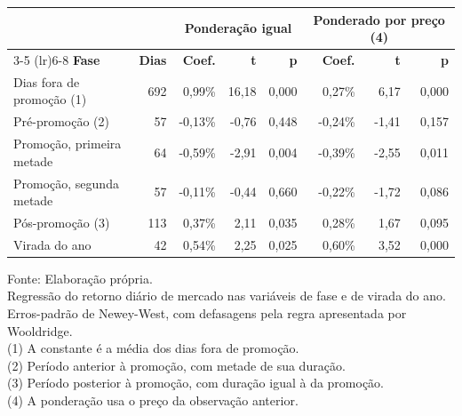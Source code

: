 \begingroup
\setlength{}
\setlength{}
\fontsize{11.0pt}{13.2pt}\selectfont

\setlength{\LTpost}{0mm}
\begin{longtable}{@{\extracolsep{\fill}}lrrrrrrr}

\toprule
 &  & \multicolumn{3}{c}{\textbf{Ponderação igual}} & \multicolumn{3}{c}{\textbf{Ponderado por preço} (4)} \\ 
\cmidrule(lr){3-5} \cmidrule(lr){6-8}
\textbf{Fase} & \textbf{Dias} & \textbf{Coef.} & \textbf{t} & \textbf{p} & \textbf{Coef.} & \textbf{t} & \textbf{p} \\ 
\midrule\addlinespace[2.5pt]
Dias fora de promoção (1) & 692 & 0,99\% & 16,18 & 0,000 & 0,27\% & 6,17 & 0,000 \\
Pré-promoção (2) & 57 & -0,13\% & -0,76 & 0,448 & -0,24\% & -1,41 & 0,157 \\
Promoção, primeira metade & 64 & -0,59\% & -2,91 & 0,004 & -0,39\% & -2,55 & 0,011 \\
Promoção, segunda metade & 57 & -0,11\% & -0,44 & 0,660 & -0,22\% & -1,72 & 0,086 \\
Pós-promoção (3) & 113 & 0,37\% & 2,11 & 0,035 & 0,28\% & 1,67 & 0,095 \\
Virada do ano & 42 & 0,54\% & 2,25 & 0,025 & 0,60\% & 3,52 & 0,000 \\
\bottomrule
\end{longtable}
\begin{minipage}{\linewidth}
Fonte: Elaboração própria.\\
Regressão do retorno diário de mercado nas variáveis de fase e de virada do ano. Erros-padrão de Newey-West, com defasagens pela regra apresentada por Wooldridge.\\
(1) A constante é a média dos dias fora de promoção.\\
(2) Período anterior à promoção, com metade de sua duração.\\
(3) Período posterior à promoção, com duração igual à da promoção.\\
(4) A ponderação usa o preço da observação anterior.\\
\end{minipage}
\endgroup
